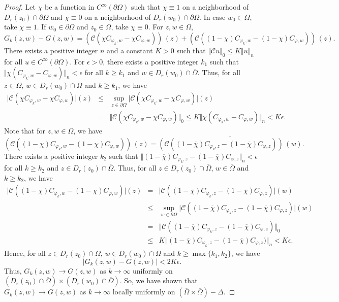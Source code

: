 \documentclass[10pt,a4paper]{amsart}
\begin{document}
\begin{proof}
Let $\chi$ be a function in $C^{\infty}(\partial\Omega)$ such that $\chi\equiv 1$ on a neighborhood of $\overline{D_r(z_0)}\cap \partial\Omega$ and $\chi\equiv 0$ on a neighborhood of $\overline{D_r(w_0)}\cap \partial\Omega$. In case $w_0\in\Omega$, take $\chi\equiv 1$. If $w_0\in\partial\Omega$ and $z_0\in\Omega$, take $\chi\equiv 0$. For $z,w\in\Omega$,
\[
G_k(z,w)-G(z,w)=(\mathcal{C}(\chi C_{\varphi_k,w} - \chi C_{\varphi,w}))\,(z) + (\mathcal{C}((1-\chi)C_{\varphi_k,w} - (1-\chi)C_{\varphi,w}))\,(z).
\]
There exists a positive integer $n$ and a constant $K>0$ such that $\Vert \mathcal{C}u\Vert_0\leq K \Vert u\Vert_{n}$ for all $u\in C^{\infty}(\partial\Omega)$.
For $\epsilon>0$, there exists a positive integer $k_1$ such that $\Vert \chi(C_{\varphi_k,w} - C_{\varphi,w})\Vert_n<\epsilon$ for all  $k\geq k_1$ and $w\in D_r(w_0)\cap \overline{\Omega}$. Thus, for all $z\in \overline{\Omega}$, $w\in D_r(w_0)\cap \overline{\Omega}$ and $k\geq k_1$, we have
\begin{eqnarray*}
\vert \mathcal{C}(\chi C_{\varphi_k,w} - \chi C_{\varphi,w})\vert(z) 
&\leq&
\sup_{z\in\partial\Omega}\vert \mathcal{C}(\chi C_{\varphi_k,w} - \chi C_{\varphi,w})\vert(z)\\
&=&
\Vert \mathcal{C}(\chi C_{\varphi_k,w} - \chi C_{\varphi,w})\Vert_0
\leq
K \Vert \chi(C_{\varphi_k,w} - C_{\varphi,w})\Vert_n<K\epsilon.
\end{eqnarray*}
Note that for $z,w\in\Omega$, we have 
\[
(\mathcal{C}((1-\chi)C_{\varphi_k,w} - (1-\chi)C_{\varphi,w}))\,(z)
=
\overline{(\mathcal{C}((1-\overline{\chi})C_{\varphi_k,z} - (1-\overline{\chi})C_{\varphi,z}))\,(w)}.
\]
There exists a positive integer $k_2$ such that $\Vert (1-\overline{\chi})C_{\varphi_k,z} - (1-\overline{\chi})C_{\varphi,z}\Vert_n<\epsilon$ for all $k\geq k_2$ and $z\in D_r(z_0)\cap\overline{\Omega}$. Thus, for all $z\in D_r(z_0)\cap\overline{\Omega}$, $w\in \overline{\Omega}$ and $k\geq k_2$, we have
\begin{eqnarray*}
\vert \mathcal{C}((1-\chi) C_{\varphi_k,w} - (1-\chi) C_{\varphi,w})\vert(z) &=&
\vert \mathcal{C}((1-\overline{\chi}) C_{\varphi_k,z} - (1-\overline{\chi}) C_{\varphi,z})\vert(w)\\
&\leq&
\sup_{w\in\partial\Omega}\vert \mathcal{C}((1-\overline{\chi}) C_{\varphi_k,z} - (1-\overline{\chi}) C_{\varphi,z})\vert(w)\\
&=&
\Vert \mathcal{C}((1-\overline{\chi}) C_{\varphi_k,z} - (1-\overline{\chi}) C_{\varphi,z})\Vert_0\\
&\leq&
K \Vert (1-\overline{\chi})C_{\varphi_k,z} - (1-\overline{\chi})C_{\varphi,z})\Vert_n<K\epsilon.
\end{eqnarray*}
Hence, for all $z\in D_r(z_0)\cap\overline{\Omega}$, $w\in D_r(w_0)\cap\overline{\Omega}$ and $k\geq \max\{k_1,k_2\}$, we have
\[
\vert G_k(z,w)-G(z,w)\vert <2K\epsilon.
\]
Thus, $G_k(z,w)\rightarrow G(z,w)$ as $k\rightarrow\infty$ uniformly on $(D_r(z_0)\cap\overline{\Omega})\times (D_r(w_0)\cap\overline{\Omega})$. So, we have shown that $G_k(z,w)\rightarrow G(z,w)$ as $k\rightarrow\infty$ locally uniformly on $(\overline{\Omega}\times\overline{\Omega})-\Delta$.


\end{proof}
\end{document}
